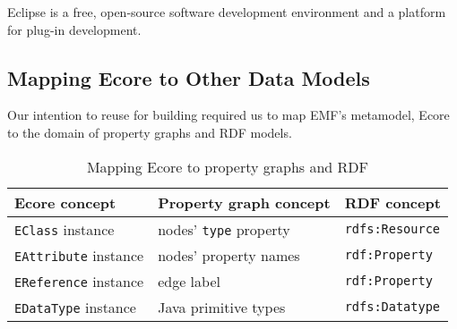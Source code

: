 
Eclipse is a free, open-source software development environment and a platform for plug-in development. 


 

\subsection{Mapping Ecore to Other Data Models}
\label{ecore-mapping}

Our intention to reuse \eiq{} for building \iqd{} required us to map EMF's metamodel, Ecore to the domain of property graphs and RDF models.

\begin{table}[htb]

\centering
\begin{tabular}{ | l | l | l | }

\hline
\bf Ecore concept          & \bf Property graph concept  & \bf RDF concept \tabularnewline \hline\hline
\verb+EClass+ instance     & nodes' \verb+type+ property & \verb+rdfs:Resource+ \\ \hline
\verb+EAttribute+ instance & nodes' property names       & \verb+rdf:Property+  \\ \hline
\verb+EReference+ instance & edge label                  & \verb+rdf:Property+  \\ \hline
\verb+EDataType+ instance  & Java primitive types        & \verb+rdfs:Datatype+ \\ \hline
 
\end{tabular}
\caption{Mapping Ecore to property graphs and RDF}
\label{tab:ecore-mapping}

\end{table}




